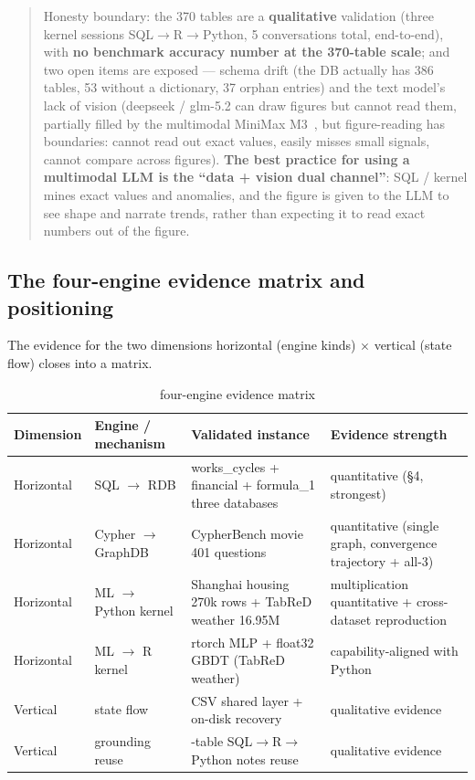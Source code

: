 \documentclass[11pt]{article}
\begin{document}
\begin{quote}
Honesty boundary: the 370 tables are a \textbf{qualitative} validation (three kernel sessions SQL$\rightarrow$R$\rightarrow$Python, 5 conversations total, end-to-end), with \textbf{no benchmark accuracy number at the 370-table scale}; and two open items are exposed --- schema drift (the DB actually has 386 tables, 53 without a dictionary, 37 orphan entries) and the text model's lack of vision (deepseek / glm-5.2 can draw figures but cannot read them, partially filled by the multimodal MiniMax M3~\cite{minimax-m3}, but figure-reading has boundaries: cannot read out exact values, easily misses small signals, cannot compare across figures). \textbf{The best practice for using a multimodal LLM is the ``data + vision dual channel''}: SQL / kernel mines exact values and anomalies, and the figure is given to the LLM to see shape and narrate trends, rather than expecting it to read exact numbers out of the figure.
\end{quote}

\subsection{The four-engine evidence matrix and positioning}

The evidence for the two dimensions horizontal (engine kinds) $\times$ vertical (state flow) closes into a matrix.

\begin{table}[htbp]
\centering
\caption{four-engine evidence matrix}
\label{tab:7}
\small
\begin{tabular}{@{}
  >{\raggedright\arraybackslash}p{}
  >{\raggedright\arraybackslash}p{}
  >{\raggedright\arraybackslash}p{}
  >{\raggedright\arraybackslash}p{}@{}}
\toprule
Dimension & Engine / mechanism & Validated instance & Evidence strength \\
\midrule
Horizontal & SQL $\rightarrow$ RDB & works\_cycles + financial + formula\_1 three databases & quantitative (\S{}4, strongest) \\
Horizontal & Cypher $\rightarrow$ GraphDB & CypherBench movie 401 questions & quantitative (single graph, convergence trajectory + all-3) \\
Horizontal & ML $\rightarrow$ Python kernel & Shanghai housing 270k rows + TabReD weather 16.95M & multiplication quantitative + cross-dataset reproduction \\
Horizontal & ML $\rightarrow$ R kernel & rtorch MLP + float32 GBDT (TabReD weather) & capability-aligned with Python \\
Vertical & state flow & CSV shared layer + on-disk recovery & qualitative evidence \\
Vertical & grounding reuse & 370-table SQL$\rightarrow$R$\rightarrow$Python notes reuse & qualitative evidence \\
\bottomrule
\end{tabular}
\end{table}
\end{document}
